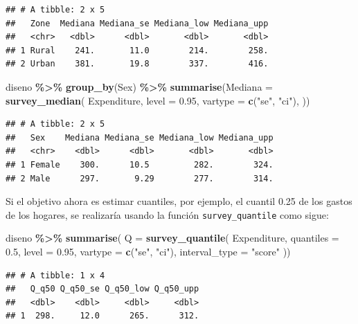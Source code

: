 \documentclass[
  12pt,
]{book}
\newenvironment{Shaded}{\begin{snugshade}}{\end{snugshade}}
\newcommand{\AttributeTok}[1]{\textcolor[rgb]{0.13,0.29,0.53}{#1}}
\newcommand{\FloatTok}[1]{\textcolor[rgb]{0.00,0.00,0.81}{#1}}
\newcommand{\FunctionTok}[1]{\textcolor[rgb]{0.13,0.29,0.53}{\textbf{#1}}}
\newcommand{\NormalTok}[1]{#1}
\newcommand{\SpecialCharTok}[1]{\textcolor[rgb]{0.81,0.36,0.00}{\textbf{#1}}}
\newcommand{\StringTok}[1]{\textcolor[rgb]{0.31,0.60,0.02}{#1}}
\begin{document}
\begin{verbatim}
## # A tibble: 2 x 5
##   Zone  Mediana Mediana_se Mediana_low Mediana_upp
##   <chr>   <dbl>      <dbl>       <dbl>       <dbl>
## 1 Rural    241.       11.0        214.        258.
## 2 Urban    381.       19.8        337.        416.
\end{verbatim}

\begin{Shaded}
\begin{Highlighting}[]
\NormalTok{diseno }\SpecialCharTok{\%\textgreater{}\%} \FunctionTok{group\_by}\NormalTok{(Sex) }\SpecialCharTok{\%\textgreater{}\%}
  \FunctionTok{summarise}\NormalTok{(}\AttributeTok{Mediana =}
  \FunctionTok{survey\_median}\NormalTok{(}
\NormalTok{    Expenditure,}
    \AttributeTok{level =} \FloatTok{0.95}\NormalTok{,}
    \AttributeTok{vartype =}  \FunctionTok{c}\NormalTok{(}\StringTok{"se"}\NormalTok{, }\StringTok{"ci"}\NormalTok{),}
\NormalTok{   ))}
\end{Highlighting}
\end{Shaded}

\begin{verbatim}
## # A tibble: 2 x 5
##   Sex    Mediana Mediana_se Mediana_low Mediana_upp
##   <chr>    <dbl>      <dbl>       <dbl>       <dbl>
## 1 Female    300.      10.5         282.        324.
## 2 Male      297.       9.29        277.        314.
\end{verbatim}

Si el objetivo ahora es estimar cuantiles, por ejemplo, el cuantil 0.25 de los gastos de los hogares, se realizaría usando la función \texttt{survey\_quantile} como sigue:

\begin{Shaded}
\begin{Highlighting}[]
\NormalTok{diseno }\SpecialCharTok{\%\textgreater{}\%}
  \FunctionTok{summarise}\NormalTok{(}
    \AttributeTok{Q =}  \FunctionTok{survey\_quantile}\NormalTok{(}
\NormalTok{    Expenditure,}
    \AttributeTok{quantiles =} \FloatTok{0.5}\NormalTok{,}
    \AttributeTok{level =} \FloatTok{0.95}\NormalTok{,}
    \AttributeTok{vartype =}  \FunctionTok{c}\NormalTok{(}\StringTok{"se"}\NormalTok{, }\StringTok{"ci"}\NormalTok{),}
    \AttributeTok{interval\_type =} \StringTok{"score"}
\NormalTok{   ))}
\end{Highlighting}
\end{Shaded}

\begin{verbatim}
## # A tibble: 1 x 4
##   Q_q50 Q_q50_se Q_q50_low Q_q50_upp
##   <dbl>    <dbl>     <dbl>     <dbl>
## 1  298.     12.0      265.      312.
\end{verbatim}
\end{document}
